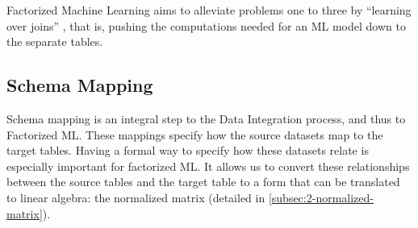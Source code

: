 Factorized Machine Learning aims to alleviate problems one to three by “learning over joins” \cite{orion_learning_gen_lin_models}, that is, pushing the computations needed for an ML model down to the separate tables.

\subsection{Schema Mapping}
Schema mapping is an integral step to the Data Integration process, and thus to Factorized ML. These mappings specify how the source datasets map to the target tables. Having a formal way to specify how these datasets relate is especially important for factorized ML. It allows us to convert these relationships between the source tables and the target table to a form that can be translated to linear algebra: the normalized matrix (detailed in \autoref{subsec:2-normalized-matrix}).

